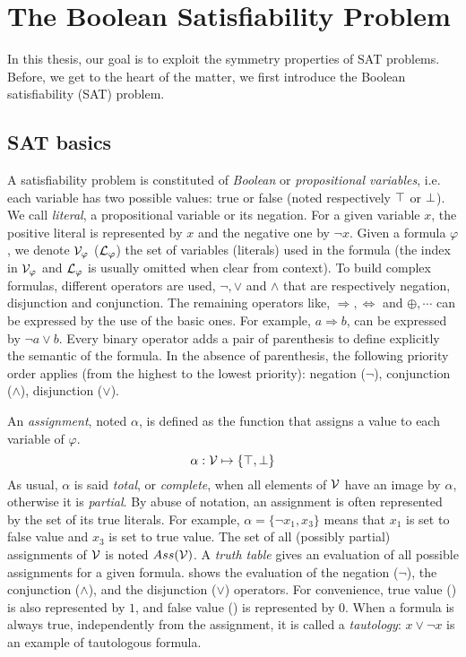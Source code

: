 \chapter{The Boolean Satisfiability Problem}\label{chap:preliminaries}
\minitoc
In this thesis, our goal is to exploit the symmetry properties of SAT problems.
Before, we get to the heart of the matter, we first introduce the Boolean satisfiability (SAT)  problem.

\section{SAT basics}
A satisfiability problem is constituted of \emph{Boolean} or \emph{propositional variables},
i.e. each variable has two possible values: true or false (noted respectively $\top$ or $\bot$).
We call \emph{literal}, a propositional variable or its negation.
For a given variable $x$, the positive literal is represented by $x$ and the negative one by $\neg x$.
Given a formula $\varphi$, we denote $\mathcal{V}_\varphi$ ($\mathcal{L}_\varphi$) the set of variables (literals) used in the formula (the index in $\mathcal{V}_\varphi$ and $\mathcal{L}_\varphi$ is usually omitted when
clear from context).
To build complex formulas, different operators are used, $\neg, \lor$ and $\land$ that are respectively negation, disjunction and conjunction. The remaining operators like, $\Rightarrow, \Leftrightarrow$ and
$\oplus, \cdots$ can be expressed by the use of the basic ones.
For example, $a \Rightarrow b$, can be expressed by $ \neg a \lor b$.
Every binary operator adds a pair of parenthesis to define explicitly the semantic of the formula.
In the absence of parenthesis, the following priority order applies (from the highest to the lowest priority):
negation ($\neg$), conjunction ($\land$), disjunction ($\lor$).

An \emph{assignment}, noted $\alpha$, is defined as the function that assigns a value to each variable of $\varphi$.
 $$\alpha: \mathcal{V} \mapsto \{ \top, \bot \}$$
 As usual, $\alpha$ is said \emph{total}, or \emph{complete}, when all elements of $\mathcal{V}$ have an image by
$\alpha$, otherwise it is \emph{partial}. By abuse of notation, an assignment is
often represented by the set of its true literals. For example, $\alpha = \{\neg x_1, x_3 \}$ means that $x_1$
is set to false value and $x_3$ is set to true value.
  The set of all (possibly partial) assignments of $\mathcal{V}$ is noted $Ass(\mathcal{V})$.
A \emph{truth table} gives an evaluation of all possible assignments for a given formula.
 shows the evaluation of the negation ($\neg$), the conjunction ($\land$), and the disjunction ($\lor$) operators.
For convenience, true value (\true) is also represented by $1$, and false value (\false) is represented by $0$.
When a formula is always true, independently from the assignment, it is called a \emph{tautology}: $x \lor \neg x$ is 
an example of tautologous formula.

